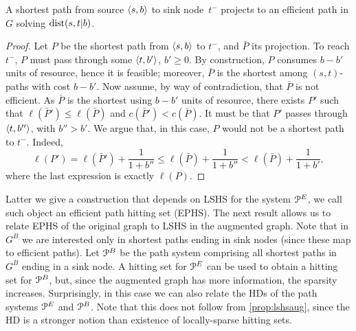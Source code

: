 \begin{proposition}\label{prop:shorteffic}
A shortest path from source $\langle s,b\rangle$ to sink node~$t^-$ projects to an efficient path in $G$ solving $\mbox{dist}(s,t|b)$. 
\end{proposition}
\begin{proof}
Let $P$ be the shortest path from $\langle s,b\rangle$ to $t^-$, and $\bar P$ its projection.
To reach $t^-$, $P$ must pass through some $\langle t,b'\rangle$, $b'\geq 0$.
By construction, $P$ consumes $b-b'$ units of resource, hence it is feasible; moreover, $\bar P$ is the shortest among $(s,t)$-paths with cost $b-b'$.
Now assume, by way of contradiction, that $\bar P$ is not efficient.
As $\bar P$ is the shortest using $b-b'$ units of resource, there exists $P'$ such that $\ell(\bar P')\leq \ell(\bar P)$ and $c(\bar P')< c(\bar P)$.
It must be that $P'$ passes through $\langle t,b''\rangle$, with $b''>b'$.
We argue that, in this case, $P$ would not be a shortest path to $t^-$.
Indeed, 
\[
\ell(P')=\ell(\bar P')+\frac{1}{1+b''}
\leq \ell(\bar P) +\frac{1}{1+b''}
< \ell(\bar P) +\frac{1}{1+b'},
\]
where the last expression is exactly $\ell(P)$.
\end{proof}


Latter we give a construction that depends on LSHS for the system $\mathcal{P}^E$, we call such object an efficient path hitting set (EPHS).
The next result allows us to relate EPHS of the original graph to LSHS in the augmented graph.
Note that in $G^B$ we are interested only in shortest paths ending in sink nodes (since these map to efficient paths). 
Let $\mathcal{P}^B$ be the path system comprising all shortest paths in $G^B$ ending in a sink node.
A hitting set for $\mathcal{P}^E$ can be used to obtain a hitting set for $\mathcal{P}^B$, but, since the augmented graph has more information, the sparsity increases.
Surprisingly, in this case we can also relate the HDs of the path systems $\mathcal{P}^E$ and $\mathcal{P}^B$.
Note that this does not follow from \cref{prop:lshsaug}, since the HD is a stronger notion than existence of locally-sparse hitting sets.
 

